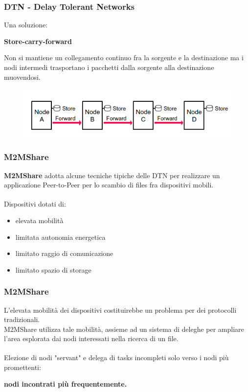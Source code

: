 \documentclass{beamer}
\begin{document}
\begin{frame}
\frametitle{DTN - Delay Tolerant Networks}
Una soluzione:
\ \\
\begin{center}
\textbf{Store-carry-forward}\\
\end{center}

Non si mantiene un collegamento continuo fra la sorgente e la destinazione ma i nodi intermedi trasportano i pacchetti dalla sorgente alla destinazione muovendosi.

\begin{center}
\begin{figure}[ht]
\includegraphics[scale=0.4]{store-and-forward.png}
\end{figure}
\end{center}
\end{frame}




\begin{frame}
\frametitle{M2MShare}
\label{M2MShare}
\textbf{M2MShare} adotta alcune tecniche tipiche delle DTN per realizzare un applicazione Peer-to-Peer per lo scambio di files fra dispositivi mobili.
\ \\
\ \\
\pause 
Dispositivi dotati di:
\begin{itemize}
\item elevata mobilità
\item limitata autonomia energetica
\item limitato raggio di comunicazione
\item limitato spazio di storage
\end{itemize}
\end{frame}

\begin{frame}
\frametitle{M2MShare}
L'elevata mobilità dei dispositivi costituirebbe un problema per dei protocolli tradizionali.\\
M2MShare utilizza tale mobilità, assieme ad un sistema di deleghe per ampliare l'area esplorata dai nodi interessati nella ricerca di un file.
\ \\
\ \\
\pause
Elezione di nodi "servant" e delega di tasks incompleti solo verso i nodi più promettenti: \\
\begin{center}
\textbf{nodi incontrati più frequentemente.}
\end{center}
\end{frame}
\end{document}
